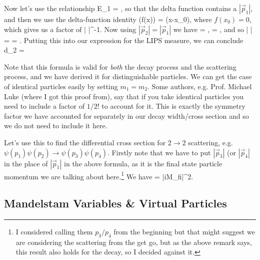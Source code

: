 Now let's use the relationship
\bse 
    E_1 = ,
\ese 
so that the delta function contains a $|\vec{p}_1|$, and then we use the delta-function identity 
\bse 
    \del\big(f(x)\big) =  \del(x-x_0),
\ese 
where $f(x_0)=0$, which gives us a factor of 
\bse 
    \bigg| \bigg|^{-1}.
\ese
Now using $|\vec{p}_2|=|\vec{p}_1|$ we have 
\bse 
     = , \qand {} = ,
\ese 
and so 
\bse 
    \bigg| \bigg| =  = .
\ese 
Putting this into our expression for the LIPS measure, we can conclude 
\bse 
    d\Pi_2 =  
\ese 

\br 
    Note that this formula is valid for \textit{both} the decay process and the scattering process, and we have derived it for distinguishable particles. We can get the case of identical particles easily by setting $m_1=m_2$. Some authors, e.g. Prof. Michael Luke (where I got this proof from), say that if you take identical particles you need to include a factor of $1/2!$ to account for it. This is exactly the symmetry factor we have accounted for separately in our decay width/cross section and so we do not need to include it here. 
\er 

Let's use this to find the differential cross section for $2\to 2$ scattering, e.g. $\psi(p_1)\psi(p_2)\to\psi(p_3)\psi(p_4)$. Firstly note that we have to put $|\vec{p}_3|$ (or $|\vec{p}_4|$ in the place of $|\vec{p}_1|$ in the above formula, as it is the final state particle momentum we are talking about here.\footnote{I considered calling them $p_3/p_4$ from the beginning but that might suggest we are considering the scattering from the get go, but as the above remark says, this result also holds for the decay, so I decided against it.} We have 
\be
\label{eqn:2to2CorssSection}
     =    |iM_{fi}|^2.
\ee 

\subsection{Mandelstam Variables \& Virtual Particles}

